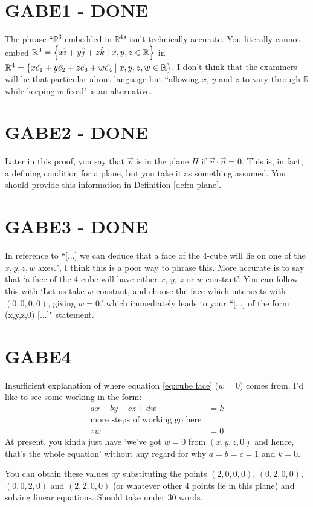 \section{GABE1 - DONE}
The phrase ``$\mathbb{R}^{3}$ embedded in $\mathbb{R}^{4}$" isn't technically accurate. You literally cannot embed $\mathbb{R}^{3} = \left\{ x \Hat{i} + y \Hat{j} + z \Hat{k} \mid x,y,z\in\mathbb{R} \right\}$ in $\mathbb{R}^{4} = \left\{ x \Hat{e_1} + y \Hat{e_2} + z \Hat{e_3} + w \Hat{e_4} \mid x,y,z,w\in\mathbb{R} \right\}$. I don't think that the examiners will be that particular about language but ``allowing $x$, $y$ and $z$ to vary through $\mathbb{R}$ while keeping $w$ fixed" is an alternative.

\section{GABE2 - DONE}
Later in this proof, you say that $\Vec{v}$ is in the plane $\Pi$ if $\Vec{v} \cdot \Vec{n} = 0$. This is, in fact, a defining condition for a plane, but you take it as something assumed. You should provide this information in Definition \ref{def:n-plane}.

\section{GABE3 - DONE}
In reference to ``[...] we can deduce that a face of the 4-cube will lie on one of the $x,y,z,w$ axes.", I think this is a poor way to phrase this. More accurate is to say that `a face of the 4-cube will have either $x$, $y$, $z$ or $w$ constant'. You can follow this with `Let us take $w$ constant, and choose the face which intersects with $(0,0,0,0)$, giving $w=0$.' which immediately leads to your ``[...] of the form (x,y,z,0) [...]" statement.

\section{GABE4}
Insufficient explanation of where equation \ref{eq:cube face} ($w = 0$) comes from. I'd like to see some working in the form:
\begin{align*}
    ax+by+cz+dw &= k \\
    \text{more steps of working go here} \\
    \therefore w &= 0
\end{align*}
At present, you kinda just have `we've got $w=0$ from $(x,y,z,0)$ and hence, that's the whole equation' without any regard for why $a=b=c=1$ and $k=0$.
\par You can obtain these values by substituting the points $(2,0,0,0)$, $(0,2,0,0)$, $(0,0,2,0)$ and $(2,2,0,0)$ (or whatever other 4 points lie in this plane) and solving linear equations. Should take under 30 words.

